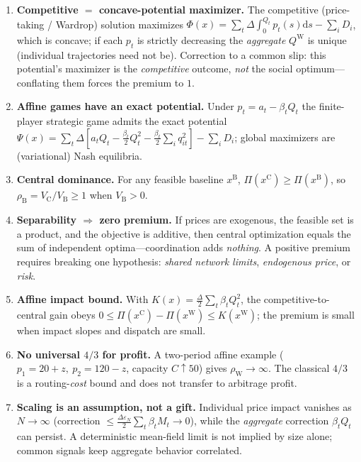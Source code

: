 \documentclass[11pt]{article}
\newcommand{\dd}{\mathrm d}
\newcommand{\cen}{\mathrm C}
\begin{document}
\begin{enumerate}
\item \textbf{Competitive $=$ concave-potential maximizer.} The competitive
(price-taking / Wardrop) solution maximizes
$\Phi(x)=\sum_t\Delta\int_0^{Q_t}p_t(s)\dd s-\sum_i D_i$, which is concave; if
each $p_t$ is strictly decreasing the \emph{aggregate} $Q^{\mathrm W}$ is
unique (individual trajectories need not be). Correction to a common slip:
this potential's maximizer is the \emph{competitive} outcome, \emph{not} the
social optimum---conflating them forces the premium to $1$.

\item \textbf{Affine games have an exact potential.} Under $p_t=a_t-\beta_tQ_t$
the finite-player strategic game admits the exact potential
$\Psi(x)=\sum_t\Delta[a_tQ_t-\tfrac{\beta_t}{2}Q_t^2-\tfrac{\beta_t}{2}\sum_i
q_{it}^2]-\sum_iD_i$; global maximizers are (variational) Nash equilibria.

\item \textbf{Central dominance.} For any feasible baseline $x^{\mathrm B}$,
$\Pi(x^{\cen})\ge\Pi(x^{\mathrm B})$, so $\rho_{\mathrm B}=V_\cen/V_{\mathrm
B}\ge1$ when $V_{\mathrm B}>0$.

\item \textbf{Separability $\Rightarrow$ zero premium.} If prices are
exogenous, the feasible set is a product, and the objective is additive, then
central optimization equals the sum of independent optima---coordination adds
\emph{nothing}. A positive premium requires breaking one hypothesis:
\emph{shared network limits}, \emph{endogenous price}, or \emph{risk}.

\item \textbf{Affine impact bound.} With $K(x)=\tfrac{\Delta}{2}\sum_t\beta_t
Q_t^2$, the competitive-to-central gain obeys $0\le\Pi(x^{\cen})-\Pi(x^{\mathrm
W})\le K(x^{\mathrm W})$; the premium is small when impact slopes and dispatch
are small.

\item \textbf{No universal $4/3$ for profit.} A two-period affine example
($p_1=20+z,\ p_2=120-z$, capacity $C\uparrow50$) gives
$\rho_{\mathrm W}\to\infty$. The classical $4/3$ is a routing-\emph{cost}
bound and does not transfer to arbitrage profit.

\item \textbf{Scaling is an assumption, not a gift.} Individual price impact
vanishes as $N\to\infty$ (correction $\le\tfrac{\Delta\varepsilon_N}{2}\sum_t
\beta_tM_t\to0$), while the \emph{aggregate} correction $\beta_tQ_t$ can
persist. A deterministic mean-field limit is not implied by size alone;
common signals keep aggregate behavior correlated.
\end{enumerate}
\end{document}
